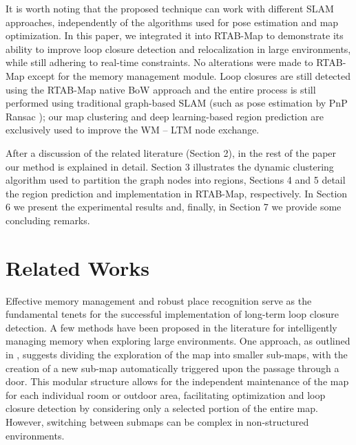 \documentclass[letterpaper, 10 pt, conference]{ieeeconf}  %
\begin{document}
It is worth noting that the proposed technique can work with different SLAM approaches, independently of the algorithms used for pose estimation and map optimization. In this paper, we integrated it into RTAB-Map to demonstrate its ability to improve loop closure detection and relocalization in large environments, while still adhering to real-time constraints. No alterations were made to RTAB-Map except for the memory management module. Loop closures are still detected using the RTAB-Map native BoW approach \cite{b5}  and the entire process is still performed using traditional graph-based SLAM (such as pose estimation by PnP Ransac \cite{b6}); our map clustering and deep learning-based region prediction are exclusively used to improve the WM – LTM node exchange. 

After a discussion of the related literature (Section 2), in the rest of the paper our method is explained in detail. Section 3 illustrates the dynamic clustering algorithm used to partition the graph nodes into regions, Sections 4 and 5 detail the region prediction and implementation in RTAB-Map, respectively. In Section 6 we present the experimental results and, finally, in Section 7 we provide some concluding remarks.

\section{Related Works} \label{relatedworks}
Effective memory management and robust place recognition serve as the fundamental tenets for the successful implementation of long-term loop closure detection. A few methods have been proposed in the literature for intelligently managing memory when exploring large environments. One approach, as outlined in \cite{b7}, suggests dividing the exploration of the map into smaller sub-maps, with the creation of a new sub-map automatically triggered upon the passage through a door. This modular structure allows for the independent maintenance of the map for each individual room or outdoor area, facilitating optimization and loop closure detection by considering only a selected portion of the entire map. However, switching between submaps can be complex in non-structured environments. 
\end{document}
